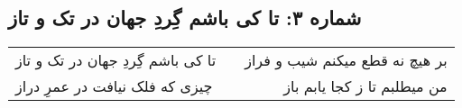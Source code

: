 \begin{center}
\section*{شماره ۳: تا کی باشم گِردِ جهان در تک و تاز}
\label{sec:003}
\begin{longtable}{l p{0.5cm} r}
تا کی باشم گِردِ جهان در تک و تاز
&&
بر هیچ نه قطع میکنم شیب و فراز
\\
چیزی که فلک نیافت در عمرِ دراز
&&
من میطلبم تا ز کجا یابم باز
\\
\end{longtable}
\end{center}
